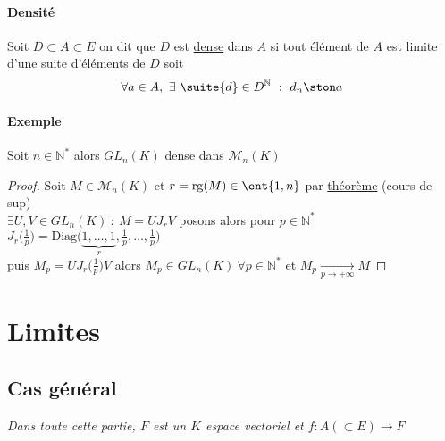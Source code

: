 		\paragraph{Densité}
			Soit $D\subset A\subset E$ on dit que $D$ est \underline{dense} dans $A$ si tout élément de $A$ est limite d'une suite d'éléments 
			de $D$ soit \[\forall a\in A ,~\exists ~\suite{d} \in D^{\mathbb{N}} ~:~d_n\ston a\] \trait
		\paragraph{Exemple} Soit $n\in\mathbb{N}^*$ alors $GL_n(K)$ dense dans $\mathcal{M}_n (K)$
			\begin{proof} Soit $M \in \mathcal{M}_n (K)$ et $r=\mathrm{rg}(M) \in \ent{1,n}$ par \underline{théorème} (cours de sup) \\
			$\exists U,V \in GL_n(K) ~:~M=UJ_rV$ posons alors pour $p\in\mathbb{N}^*$ $J_r\bigl(\frac{1}{p}\bigr) = 
			\mathrm{Diag}\bigl(\underbrace{1,\dots ,1}_r,\frac{1}{p} ,\dots ,\frac{1}{p}\bigr)$ \\ puis $M_p = UJ_r\bigl(\frac{1}{p}\bigr) V$ alors 
			$M_p \in GL_n(K) ~\forall p\in\mathbb{N}^*$ et $M_p \underset{p\rightarrow +\infty}{\longrightarrow} M$ \end{proof}
	\section{Limites}
	\subsection{Cas général}
		\textit{Dans toute cette partie, $F$ est un $K$ espace vectoriel et $f:A(\subset E) \rightarrow F$} \traitd
